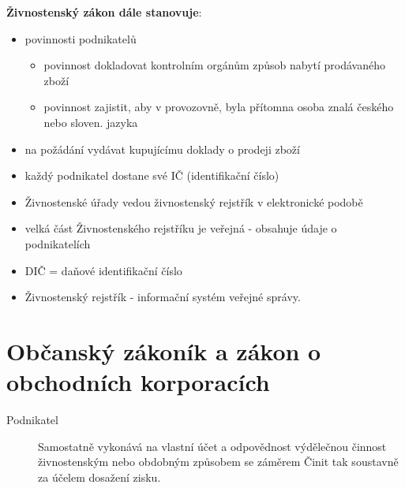 \documentclass[11pt,a4paper,twoside]{book}
\begin{document}
	\textbf{Živnostenský zákon dále stanovuje}:
	\begin{itemize}
		\item povinnosti podnikatelů	
			\begin{itemize}
				\item povinnost dokladovat kontrolním orgánům způsob nabytí prodávaného zboží
				\item povinnost zajistit, aby v provozovně, byla přítomna osoba znalá českého nebo sloven. jazyka
			\end{itemize}
		\item na požádání vydávat kupujícímu doklady o prodeji zboží
		\item každý podnikatel dostane své IČ (identifikační číslo)
		\item Živnostenské úřady vedou živnostenský rejstřík v elektronické podobě
		\item velká část Živnostenského rejstříku je veřejná - obsahuje údaje o podnikatelích
		\item DIČ = daňové identifikační číslo
		\item Živnostenský rejstřík - informační systém veřejné správy.
	\end{itemize}

	\chapter{Občanský zákoník a zákon o obchodních korporacích}

	\begin{description}
		\item[Podnikatel] Samostatně vykonává na vlastní účet a odpovědnost výdělečnou činnost živnostenským nebo obdobným způsobem se záměrem Činit tak soustavně za účelem dosažení zisku.
	\end{description}
\end{document}
